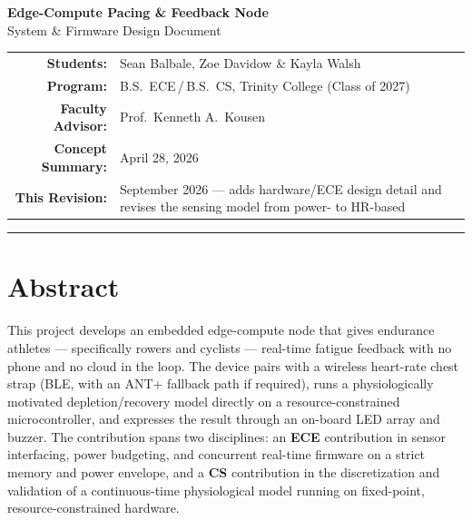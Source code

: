 \documentclass[11pt, letterpaper]{article}
\begin{document}
\begin{center}
  {\LARGE\bfseries\color{trinityblue} Edge-Compute Pacing \& Feedback Node}\\[0.4em]
  {\large\color{darkgray} System \& Firmware Design Document}\\[0.8em]
  \begin{tabular}{rl}
    \textbf{Students:}          & Sean Balbale, Zoe Davidow \& Kayla Walsh \\
    \textbf{Program:}           & B.S.\ ECE\,/\,B.S.\ CS, Trinity College (Class of 2027) \\
    \textbf{Faculty Advisor:}   & Prof.\ Kenneth A.\ Kousen \\
    \textbf{Concept Summary:}   & April 28, 2026 \\
    \textbf{This Revision:}     & \parbox{3.6in}{September 2026 --- adds hardware/ECE design
                                   detail and revises the sensing model from power- to HR-based}
  \end{tabular}
\end{center}

\vspace{0.3em}
\noindent\rule{\linewidth}{1.2pt}
\vspace{0.3em}

\section{Abstract}

This project develops an embedded edge-compute node that gives endurance athletes ---
specifically rowers and cyclists --- real-time fatigue feedback with no phone and no cloud
in the loop. The device pairs with a wireless heart-rate chest strap (BLE, with an ANT+
fallback path if required), runs a physiologically motivated depletion/recovery model directly
on a resource-constrained microcontroller, and expresses the result through an on-board LED
array and buzzer. The contribution spans two disciplines: an \textbf{ECE} contribution in
sensor interfacing, power budgeting, and concurrent real-time firmware on a strict memory and
power envelope, and a \textbf{CS} contribution in the discretization and validation of a
continuous-time physiological model running on fixed-point, resource-constrained hardware.

\end{document}

